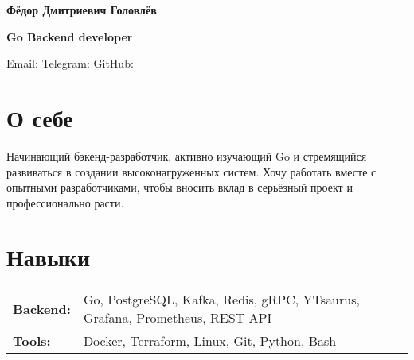 \documentclass[letterpaper,10pt]{article}
\newcommand{\MYhref}[3][Blue1]{\href{#2}{\color{#1}{#3}}}
\begin{document}

\begin{center}\textbf{\Large Фёдор Дмитриевич Головлёв}\end{center}
\begin{center}\textbf{\Large Go Backend developer}\end{center}
\vspace{-12pt}
\begin{center}
Email: \MYhref{mailto:fdgolovlev@gmail.com}{fdgolovlev@gmail.com} \quad
Telegram: \MYhref{https://t.me/Erruano}{Erruano} \quad
GitHub: \MYhref{https://github.com/Eruano-prog}{Eruano-prog}
\end{center}

\vspace{-10pt}
\section{О себе}
\justifying
Начинающий бэкенд-разработчик, активно изучающий Go и стремящийся развиваться в создании высоконагруженных систем. Хочу работать вместе с опытными разработчиками, чтобы вносить вклад в серьёзный проект и профессионально расти.

\section{Навыки}
\begin{tabular}{ll}
\textbf{Backend:} & \quad Go, PostgreSQL, Kafka, Redis, gRPC, YTsaurus, Grafana, Prometheus, REST API \\
\textbf{Tools:} & \quad Docker, Terraform, Linux, Git, Python,  Bash \\
\end{tabular}

\end{document}

